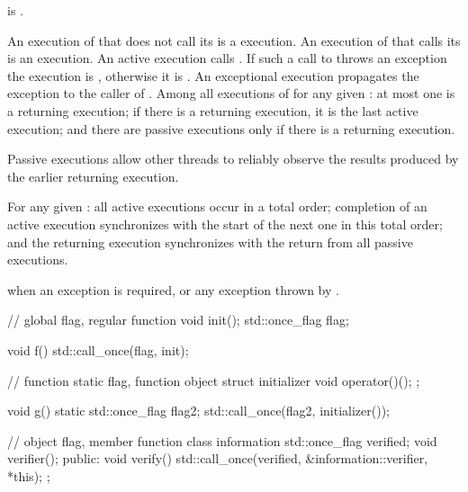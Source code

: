 \begin{itemdescr}
\pnum
\mandates
{} is .

\pnum
\effects
An execution of  that does not call its  is a
 execution. An execution of  that calls its 
is an  execution. An active execution calls
. If such a call to 
throws an exception the execution is , otherwise it is .
An exceptional execution propagates the exception to the caller of
. Among all executions of  for any given
: at most one is a returning execution; if there is a
returning execution, it is the last active execution; and there are
passive executions only if there is a returning execution.
\begin{note}
Passive
executions allow other threads to reliably observe the results produced by the
earlier returning execution.
\end{note}

\pnum
\sync
For any given : all active executions occur in a total
order; completion of an active execution synchronizes with
the start of the next one in this total order; and the returning execution
synchronizes with the return from all passive executions.

\pnum
\throws
{} when
an exception is required, or any exception thrown by .

\pnum
\begin{example}
\begin{codeblock}
// global flag, regular function
void init();
std::once_flag flag;

void f() {
  std::call_once(flag, init);
}

// function static flag, function object
struct initializer {
  void operator()();
};

void g() {
  static std::once_flag flag2;
  std::call_once(flag2, initializer());
}

// object flag, member function
class information {
  std::once_flag verified;
  void verifier();
public:
  void verify() { std::call_once(verified, &information::verifier, *this); }
};
\end{codeblock}
\end{example}
\end{itemdescr}


